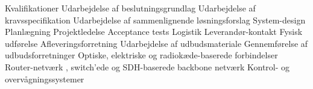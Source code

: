 \begin{rubric}{Kvalifikationer}
%
 \entry* Udarbejdelse af beslutningsgrundlag 
 \entry* Udarbejdelse af kravsspecifikation
 \entry* Udarbejdelse af sammenlignende løsningsforslag
 \entry* System-design
%
 \entry* Planlægning
 \entry* Projektledelse
 \entry* Acceptance tests
 \entry* Logistik
 \entry* Leverandør-kontakt
 \entry* Fysisk udførelse
 \entry* Afleveringsforretning
%
 \entry* Udarbejdelse af udbudsmateriale
 \entry* Gennemførelse af udbudsforretninger
 \entry* Optiske, elektriske og radiokæde-baserede forbindelser
 \entry* Router-netværk , switch'ede og SDH-baserede backbone netværk
 \entry* Kontrol- og overvågningssystemer
\end{rubric}
